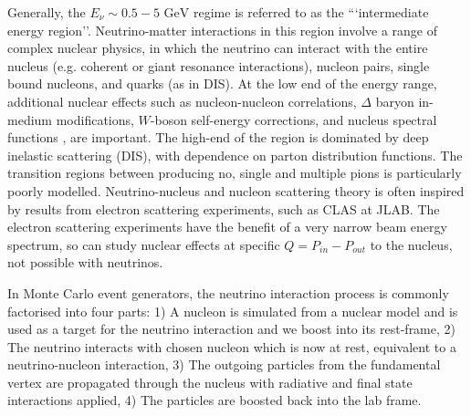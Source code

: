 Generally, the $E_\nu \sim 0.5-5\text{ GeV}$ regime is referred to as the ```intermediate energy region''. Neutrino-matter interactions in this region involve a range of complex nuclear physics, in which the neutrino can interact with the entire nucleus (e.g. coherent\cite{Berger_Sehgal_coh} or giant resonance\cite{crpa} interactions), nucleon pairs, single bound nucleons, and quarks (as in DIS). At the low end of the energy range, additional nuclear effects such as nucleon-nucleon correlations\cite{nieves1,nieves2}, $\Delta$ baryon in-medium modifications\cite{nuclear_effects_1pi}, $W$-boson self-energy corrections\cite{nieves1}, and nucleus spectral functions \cite{benhar}, are important. The high-end of the region is dominated by deep inelastic scattering (DIS), with dependence on parton distribution functions. The transition regions between producing no, single and multiple pions is particularly poorly modelled\cite{katori_martini,ulrich_review,nieves_review}. Neutrino-nucleus and nucleon scattering theory is often inspired by results from electron scattering experiments\cite{joanna}, such as CLAS\cite{clas} at JLAB. The electron scattering experiments have the benefit of a very narrow beam energy spectrum, so can study nuclear effects at specific $Q=P_{in}-P_{out}$ to the nucleus, not possible with neutrinos.

In Monte Carlo event generators, the neutrino interaction process is commonly factorised into four parts: 1) A nucleon is simulated from a nuclear model and is used as a target for the neutrino interaction and we boost into its rest-frame, 2) The neutrino interacts with chosen nucleon which is now at rest, equivalent to a neutrino-nucleon interaction, 3) The outgoing particles from the fundamental vertex are propagated through the nucleus with radiative and final state interactions applied, 4) The particles are boosted back into the lab frame.

